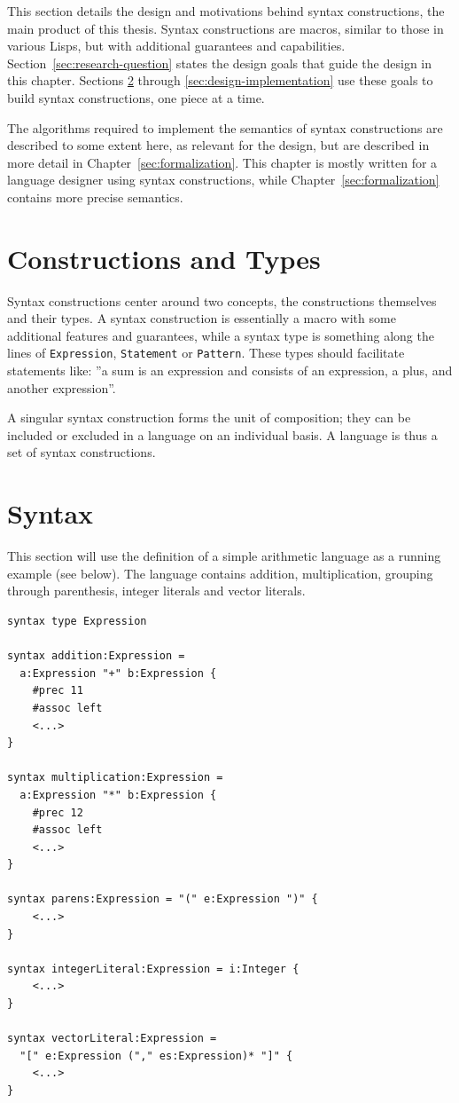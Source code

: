 \documentclass{kththesis}
\begin{document}
This section details the design and motivations behind syntax constructions, the main product of this thesis. Syntax constructions are macros, similar to those in various Lisps, but with additional guarantees and capabilities. Section~\ref{sec:research-question} states the design goals that guide the design in this chapter. Sections \ref{sec:design-syntax} through \ref{sec:design-implementation} use these goals to build syntax constructions, one piece at a time.

The algorithms required to implement the semantics of syntax constructions are described to some extent here, as relevant for the design, but are described in more detail in Chapter~\ref{sec:formalization}. This chapter is mostly written for a language designer using syntax constructions, while Chapter~\ref{sec:formalization} contains more precise semantics.

\section{Constructions and Types} \label{sec:constructions-and-types}

Syntax constructions center around two concepts, the constructions themselves and their types. A syntax construction is essentially a macro with some additional features and guarantees, while a syntax type is something along the lines of \texttt{Expression}, \texttt{Statement} or \texttt{Pattern}. These types should facilitate statements like: ''a sum is an expression and consists of an expression, a plus, and another expression''.

A singular syntax construction forms the unit of composition; they can be included or excluded in a language on an individual basis. A language is thus a set of syntax constructions.

\section{Syntax} \label{sec:design-syntax}

This section will use the definition of a simple arithmetic language as a running example (see below). The language contains addition, multiplication, grouping through parenthesis, integer literals and vector literals.

\begin{verbatim}
syntax type Expression

syntax addition:Expression =
  a:Expression "+" b:Expression {
    #prec 11
    #assoc left
    <...>
}

syntax multiplication:Expression =
  a:Expression "*" b:Expression {
    #prec 12
    #assoc left
    <...>
}

syntax parens:Expression = "(" e:Expression ")" {
    <...>
}

syntax integerLiteral:Expression = i:Integer {
    <...>
}

syntax vectorLiteral:Expression =
  "[" e:Expression ("," es:Expression)* "]" {
    <...>
}
\end{verbatim}
\end{document}
